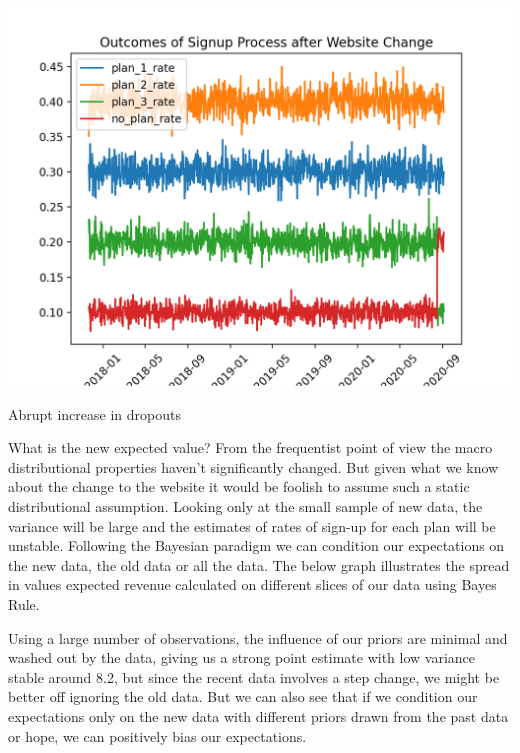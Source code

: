 \documentclass{tufte-handout}
\begin{document}
\begin{marginfigure}
  \includegraphics[width=\linewidth]{../Expectation/Plots/outcomes_of_signup_post.png}
  \caption{Abrupt increase in dropouts}
\end{marginfigure}

\noindent What is the new expected value? From the frequentist point of view the macro distributional properties haven't significantly changed. But given what we know about the change to the website it would be foolish to assume such a static distributional assumption. Looking only at the small sample of new data, the variance will be large and the estimates of rates of sign-up for each plan will be unstable.  Following the Bayesian paradigm we can condition our expectations on the new data, the old data or all the data. The below graph illustrates the spread in values expected revenue calculated on different slices of our data using Bayes Rule.
\linebreak

\noindent Using a large number of observations, the influence of our priors are minimal and washed out by the data, giving us a strong point estimate with low variance stable around 8.2, but since the recent data involves a step change, we might be better off ignoring the old data. But we can also see that if we condition our expectations only on the new data with different priors drawn from the past data or hope, we can positively bias our expectations.
\linebreak
\end{document}
